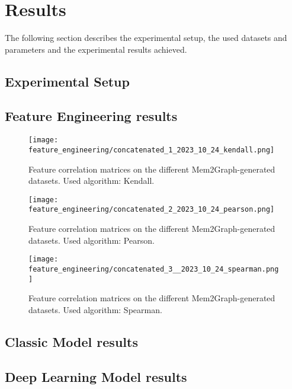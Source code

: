 \chapter{Results}\label{chap:results}

The following section describes the experimental setup, the used datasets and parameters and the experimental results achieved.

\section{Experimental Setup}

\section{Feature Engineering results}

\begin{figure}[H]\label{results:corr_matrices:kendall}
    \centering
    \texttt{[image: feature\_engineering/concatenated\_1\_2023\_10\_24\_kendall.png]}
    \caption{Feature correlation matrices on the different Mem2Graph-generated datasets. Used algorithm: Kendall.}
\end{figure}

\begin{figure}[H]\label{results:corr_matrices:pearson}
    \centering
    \texttt{[image: feature\_engineering/concatenated\_2\_2023\_10\_24\_pearson.png]}
    \caption{Feature correlation matrices on the different Mem2Graph-generated datasets. Used algorithm: Pearson.}
\end{figure}

\begin{figure}[H]\label{results:corr_matrices:spearman}
    \centering
    \texttt{[image: feature\_engineering/concatenated\_3\_\_2023\_10\_24\_spearman.png]}
    \caption{Feature correlation matrices on the different Mem2Graph-generated datasets. Used algorithm: Spearman.}
\end{figure}

\section{Classic Model results}

\section{Deep Learning Model results}



